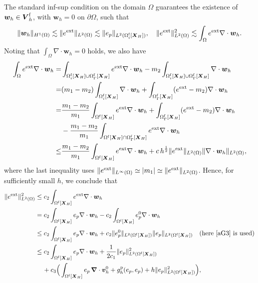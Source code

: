 \documentclass[11pt,reqno]{amsart}
\theoremstyle{definition}
\theoremstyle{plain}
\numberwithin{theorem}{section}
\numberwithin{proposition}{section}
\numberwithin{lemma}{section}
\numberwithin{equation}{section}
\newcommand{\bs}[1]{\boldsymbol{#1}}
\newcommand{\uu}[1]  {{\bs{#1}} }
\newcommand{\grad}   { \uu{\nabla}    }
\newcommand{\bw}{{\bs w}}
\newcommand{\bV}{{\bs V}}
\renewcommand{\(}{\bigl(}
\renewcommand{\)}{\bigr)}
\begin{document}
The standard inf-sup condition on the domain $\Omega$ guarantees the existence of $\bw_h\in \bV_h^{\rm f}$, with $\bw_h=0$ on $\partial \Omega$, such that 
\begin{equation}\label{aG3}
\|\bw_h\|_{H^1(\Omega)}\lesssim \|e^{\rm ext}\|_{L^2(\Omega)} \lesssim \|e_p\|_{L^2(\Omega^{\rm f}_i[{\bs X}_H])} ,\quad 
\|e^{\rm ext}\|_{L^2(\Omega)}^2\lesssim \int_\Omega e^{\rm ext} \nabla\cdot \bw_h .
\end{equation}
Noting that $\int_\Omega\nabla\cdot\bw_h=0$ holds, we also have
\begin{align*}
\int_\Omega e^{\rm ext} \nabla\cdot \bw_h=& \int_{\Omega^{\rm f}_i[{\bs X}_H]\cup \Omega^{\rm f}_{\Gamma}[{\bs X}_H]}e^{\rm ext} \nabla\cdot \bw_h  -
m_2\int_{\Omega^{\rm f}_i[{\bs X}_H]\cup \Omega^{\rm f}_{\Gamma}[{\bs X}_H]} \nabla\cdot \bw_h\\
=& (m_1-m_2)\int_{\Omega^{\rm f}_i[{\bs X}_H]} \nabla\cdot \bw_h
+\int_{\Omega^{\rm f}_{\Gamma}[{\bs X}_H]}(e^{\rm ext}-m_2) \nabla\cdot \bw_h\\ 
=&\frac{m_1-m_2}{m_1}\int_{\Omega^{\rm f}[{\bs X}_H]} e^{\rm ext} 
\nabla\cdot \bw_h
+\int_{\Omega^{\rm f}_{\Gamma}[{\bs X}_H]}(e^{\rm ext}-m_2) \nabla\cdot \bw_h
\\ &- \frac{m_1-m_2}{m_1}\int_{\Omega^{\rm f}[{\bs X}_H]\cap \Omega^{\rm f}_\Gamma[{\bs X}_H]}e^{\rm ext} \nabla\cdot \bw_h \\
\le &\frac{m_1-m_2}{m_1}\int_{\Omega^{\rm f}[{\bs X}_H]}e^{\rm ext} 
\nabla\cdot \bw_h + c\, h^{\frac12} \|e^{\rm ext}\|_{L^2(\Omega)}\|\nabla\cdot \bw_h\|_{L^2(\Omega)} ,
\end{align*}
where the last inequality uses $\|e^{\rm ext}\|_{L^\infty(\Omega)}\simeq |m_1|\simeq \|e^{\rm ext}\|_{L^2(\Omega)}$. 
Hence, for sufficiently small $h$, we conclude that
\begin{align}\label{aG4}
\|e^{\rm ext}\|_{L^2(\Omega)}^2
&\le c_2\int_{\Omega^{\rm f}[{\bs X}_H]} e^{\rm ext} \nabla\cdot \bw_h \notag\\
&=c_2\int_{\Omega^{\rm f}[{\bs X}_H]} e_p \nabla\cdot \bw_h 
-c_2\int_{\Omega^{\rm f}[{\bs X}_H]} e_p^0 \nabla\cdot \bw_h \notag\\
&\le c_2\int_{\Omega^{\rm f}[{\bs X}_H]} e_p \nabla\cdot \bw_h 
+ c_2 \| e_p^0 \|_{L^2(\Omega^{\rm f}[{\bs X}_H])}\| e_p \|_{L^2(\Omega^{\rm f}[{\bs X}_H])}
\quad\mbox{(here \eqref{aG3} is used)}\notag\\
&\le c_2\int_{\Omega^{\rm f}[{\bs X}_H]} e_p \nabla\cdot \bw_h 
+\frac{1}{2c_1} \|e_p\|_{L^2(\Omega^{\rm f}[{\bs X}_H])}^2 \notag\\
&\quad\, + c_3\Big(\int_{\Omega^{\rm f}[{\bs X}_H]} e_p \,\grad\cdot {\bs v}_h^0
+ g_h^{\rm p}(e_p,e_p) + h\|e_p\|_{L^2(\Omega^{\rm f}[{\bs X}_H])}^2 \Big) ,
\end{align}
\end{document}
